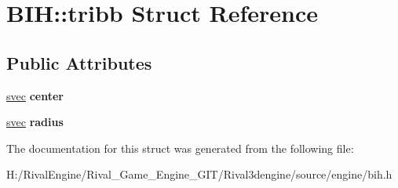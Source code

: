 \hypertarget{struct_b_i_h_1_1tribb}{}\section{B\+IH\+:\+:tribb Struct Reference}
\label{struct_b_i_h_1_1tribb}
\subsection*{Public Attributes}
\begin{DoxyCompactItemize}
\item 
\mbox{\label{struct_b_i_h_1_1tribb_aaa9362bdbca5ada342a28b125f13a217}} 
\hyperlink{structsvec}{svec} {\bfseries center}
\item 
\mbox{\label{struct_b_i_h_1_1tribb_a79ace5cb852713c9beff21dcf797c0b7}} 
\hyperlink{structsvec}{svec} {\bfseries radius}
\end{DoxyCompactItemize}


The documentation for this struct was generated from the following file\+:\begin{DoxyCompactItemize}
\item 
H\+:/\+Rival\+Engine/\+Rival\+\_\+\+Game\+\_\+\+Engine\+\_\+\+G\+I\+T/\+Rival3dengine/source/engine/bih.\+h\end{DoxyCompactItemize}
